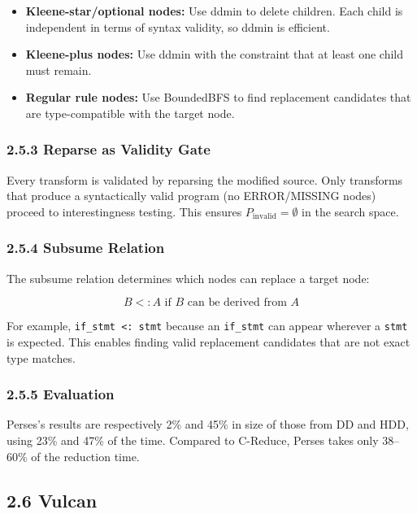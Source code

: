 \documentclass[
  letterpaper,
]{article}
\providecommand{\tightlist}{%
  \setlength{\itemsep}{0pt}\setlength{\parskip}{0pt}}
\begin{document}
\begin{itemize}
\tightlist
\item
  \textbf{Kleene-star/optional nodes:} Use ddmin to delete children.
  Each child is independent in terms of syntax validity, so ddmin is
  efficient.
\item
  \textbf{Kleene-plus nodes:} Use ddmin with the constraint that at
  least one child must remain.
\item
  \textbf{Regular rule nodes:} Use BoundedBFS to find replacement
  candidates that are type-compatible with the target node.
\end{itemize}

\subsubsection{2.5.3 Reparse as Validity
Gate}\label{reparse-as-validity-gate}

Every transform is validated by reparsing the modified source. Only
transforms that produce a syntactically valid program (no ERROR/MISSING
nodes) proceed to interestingness testing. This ensures
\(P_{\text{invalid}} = \emptyset\) in the search space.

\subsubsection{2.5.4 Subsume Relation}\label{subsume-relation}

The subsume relation determines which nodes can replace a target node:

\[
B <: A \text{ if } B \text{ can be derived from } A
\]

For example, \texttt{if\_stmt\ \textless{}:\ stmt} because an
\texttt{if\_stmt} can appear wherever a \texttt{stmt} is expected. This
enables finding valid replacement candidates that are not exact type
matches.

\subsubsection{2.5.5 Evaluation}\label{evaluation}

Perses's results are respectively 2\% and 45\% in size of those from DD
and HDD, using 23\% and 47\% of the time. Compared to C-Reduce, Perses
takes only 38--60\% of the reduction time.

\subsection{2.6 Vulcan}\label{vulcan}
\end{document}
